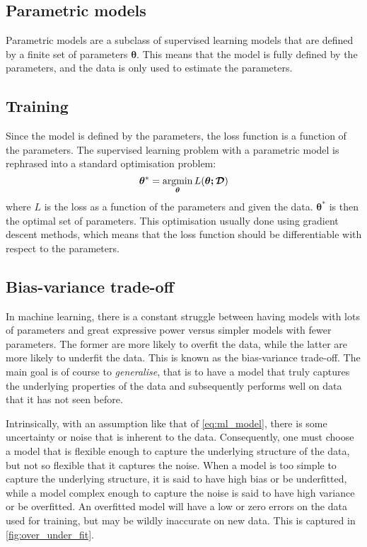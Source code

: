 \subsection{Parametric models}
Parametric models are a subclass of supervised learning models that are defined by a finite set of parameters $\bm{\theta}$.
This means that the model is fully defined by the parameters, and the data is only used to estimate the parameters.

\subsection{Training}
Since the model is defined by the parameters, the loss function is a function of the parameters.
The supervised learning problem with a parametric model is rephrased into a standard optimisation problem:
\begin{equation}
    \bm{\theta}^* = \operatorname*{argmin}_{\bm{\theta}} L(\bm{\theta; \mathcal{D}})
\end{equation}
where $L$ is the loss as a function of the parameters and given the data.
$\bm{\theta}^*$ is then the optimal set of parameters.
This optimisation usually done using gradient descent methods, which means that the loss function should be differentiable with respect to the parameters.


\subsection{Bias-variance trade-off}
In machine learning, there is a constant struggle between having models with lots of parameters and great expressive power versus simpler models with fewer parameters.
The former are more likely to overfit the data, while the latter are more likely to underfit the data.
This is known as the bias-variance trade-off.
The main goal is of course to \emph{generalise}, that is to have a model that truly captures the underlying properties of the data and subsequently performs well on data that it has not seen before.

Intrinsically, with an assumption like that of \cref{eq:ml_model}, there is some uncertainty or noise that is inherent to the data.
Consequently, one must choose a model that is flexible enough to capture the underlying structure of the data, but not so flexible that it captures the noise.
When a model is too simple to capture the underlying structure, it is said to have high bias or be underfitted, while a model complex enough to capture the noise is said to have high variance or be overfitted.
An overfitted model will have a low or zero errors on the data used for training, but may be wildly inaccurate on new data.
This is captured in \cref{fig:over_under_fit}.


